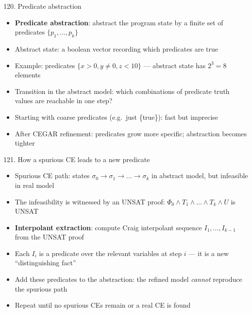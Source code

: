 \documentclass[aspectratio=169]{beamer}
\begin{document}
\begin{frame}{120. Predicate abstraction}
\begin{itemize}
  \item \textbf{Predicate abstraction}: abstract the program state by a finite set of predicates \(\{p_1, \ldots, p_k\}\)
  \item Abstract state: a boolean vector recording which predicates are true
  \item Example: predicates \(\{x > 0, y \ne 0, z < 10\}\) --- abstract state has \(2^3 = 8\) elements
  \item Transition in the abstract model: which combinations of predicate truth values are reachable in one step?
  \item Starting with coarse predicates (e.g.\ just \{true\}): fast but imprecise
  \item After CEGAR refinement: predicates grow more specific; abstraction becomes tighter
\end{itemize}
\end{frame}

\begin{frame}{121. How a spurious CE leads to a new predicate}
\begin{itemize}
  \item Spurious CE path: states \(\sigma_0 \to \sigma_1 \to \ldots \to \sigma_k\) in abstract model, but infeasible in real model
  \item The infeasibility is witnessed by an UNSAT proof: \(\Phi_0 \wedge T_1 \wedge \ldots \wedge T_k \wedge U\) is UNSAT
  \item \textbf{Interpolant extraction}: compute Craig interpolant sequence \(I_1, \ldots, I_{k-1}\) from the UNSAT proof
  \item Each \(I_i\) is a predicate over the relevant variables at step \(i\) --- it is a new ``distinguishing fact''
  \item Add these predicates to the abstraction: the refined model \emph{cannot} reproduce the spurious path
  \item Repeat until no spurious CEs remain or a real CE is found
\end{itemize}
\end{frame}
\end{document}
